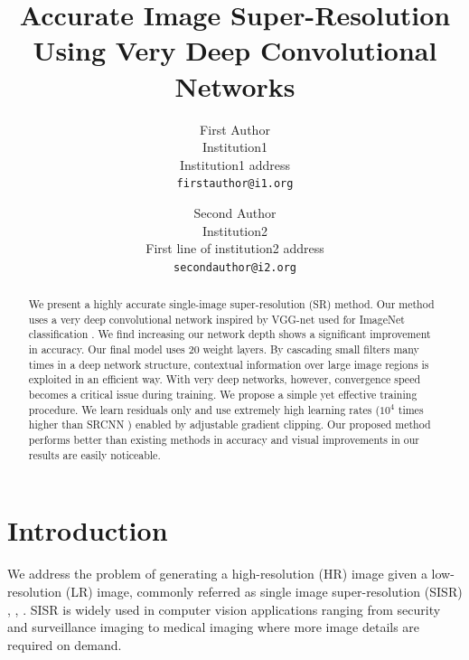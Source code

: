 \documentclass[10pt,twocolumn,letterpaper]{article}
\begin{document}
\title{Accurate Image Super-Resolution Using Very Deep Convolutional Networks}

\author{First Author\\
	Institution1\\
	Institution1 address\\
	{\tt\small firstauthor@i1.org}
	\and
	Second Author\\
	Institution2\\
	First line of institution2 address\\
	{\tt\small secondauthor@i2.org}
}

\maketitle


\begin{abstract}
We present a highly accurate single-image super-resolution (SR) method. Our method uses a very deep convolutional network inspired by VGG-net used for ImageNet classification \cite{simonyan2015very}. We find increasing our network depth shows a significant improvement in accuracy. Our final model uses 20 weight layers. By cascading small filters many times in a deep network structure, contextual information over large image regions is exploited in an efficient way. With very deep networks, however, convergence speed becomes a critical issue during training. We propose a simple yet effective training procedure. We learn residuals only and use extremely high learning rates ($10^4$ times higher than SRCNN \cite{dong2015image}) enabled by adjustable gradient clipping. Our proposed method performs better than existing methods in accuracy and visual improvements in our results are easily noticeable.
\end{abstract}

\section{Introduction}
We address the problem of generating a high-resolution (HR) image given a low-resolution (LR) image, commonly referred as single image super-resolution (SISR) \cite{Irani1991}, \cite{freeman2000learning}, \cite{glasner2009super}. SISR is widely used in computer vision applications ranging from security and surveillance imaging to medical imaging where more image details are required on demand.
\end{document}
